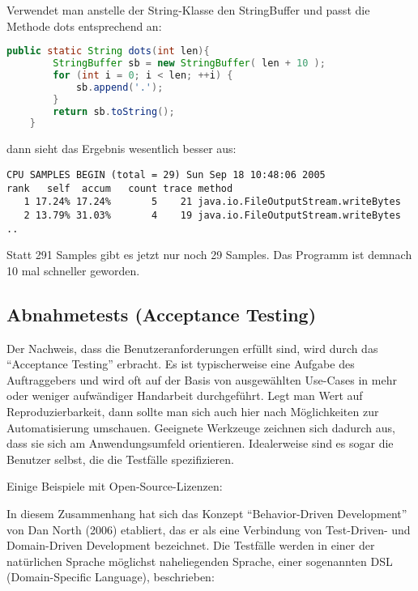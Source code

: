 Verwendet man anstelle der String-Klasse den StringBuffer und passt die
Methode dots entsprechend an:
\fi
\begin{lstlisting}[language=java]
   public static String dots(int len){
        StringBuffer sb = new StringBuffer( len + 10 );
        for (int i = 0; i < len; ++i) {
            sb.append('.');
        }
        return sb.toString();
    }
\end{lstlisting}
\ifslides
\newpage
\fi
dann sieht das Ergebnis wesentlich besser aus:
{\ifslides\footnotesize
\else\small
\fi
\begin{lstlisting}
CPU SAMPLES BEGIN (total = 29) Sun Sep 18 10:48:06 2005
rank   self  accum   count trace method
   1 17.24% 17.24%       5    21 java.io.FileOutputStream.writeBytes
   2 13.79% 31.03%       4    19 java.io.FileOutputStream.writeBytes
..
\end{lstlisting}
}
Statt 291 Samples gibt es jetzt nur noch 29 Samples. Das Programm ist demnach
10 mal schneller geworden.
%
\newpage
\subsection{Abnahmetests (Acceptance Testing)}
Der Nachweis, dass die
Benutzeranforderungen erfüllt sind, wird durch
das ``Acceptance Testing'' erbracht.
Es ist typischerweise eine Aufgabe des Auftraggebers und wird oft
auf der Basis von ausgewählten Use-Cases in mehr oder weniger
aufwändiger Handarbeit durchgeführt. Legt man Wert auf Reproduzierbarkeit,
dann sollte man sich auch hier nach Möglichkeiten zur Automatisierung
umschauen. Geeignete Werkzeuge zeichnen sich dadurch aus, dass
sie sich am Anwendungsumfeld orientieren. Idealerweise sind es sogar die
Benutzer selbst, die die Testfälle spezifizieren.

\newslide
Einige Beispiele mit Open-Source-Lizenzen:
\newslide
In diesem Zusammenhang hat sich das Konzept ``Behavior-Driven
Development'' von Dan North (2006) etabliert, das er als eine Verbindung von
Test-Driven- und Domain-Driven Development bezeichnet. Die Testfälle
werden in einer der natürlichen Sprache möglichst naheliegenden
Sprache, einer sogenannten DSL (Domain-Specific Language), beschrieben:

